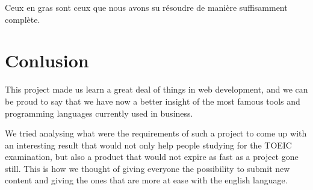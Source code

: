 \documentclass[12pt,a4paper]{report}
\begin{document}
Ceux en gras sont ceux que nous avons su résoudre de manière suffisamment complète.

\section*{Conlusion}
This project made us learn a great deal of things in web development, and we
can be proud to say that we have now a better insight of the most famous tools
and programming languages currently used in business.
 
We tried analysing what were the requirements of such a project to come up with
an interesting result that would not only help people studying for the TOEIC
examination, but also a product that would not expire as fast as a project gone
still. This is how we thought of giving everyone the possibility to submit new
content and giving the ones that are more at ease with the english language.


\end{document}
